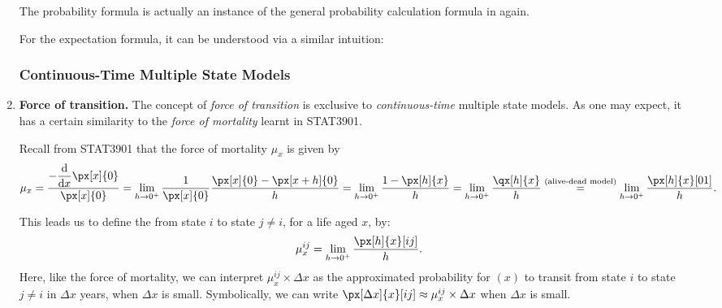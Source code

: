 \begin{enumerate}
The probability formula is actually an instance of the general
probability calculation formula in  again.
\begin{center}
\end{center}
For the expectation formula, it can be understood via a similar intuition:
\begin{center}
\end{center}
\subsubsection*{Continuous-Time Multiple State Models}
\item \textbf{Force of transition.} The concept of \emph{force of transition}
is exclusive to \emph{continuous-time} multiple state models. As one may
expect, it has a certain similarity to the \emph{force of mortality} learnt in
STAT3901.

Recall from STAT3901 that the force of mortality \(\mu_{x}\) is given by
\[
\mu_{x}=\frac{\displaystyle -\dv{}{x}\px[x]{0}}{\px[x]{0}}
=\lim_{h\to 0^{+}}\frac{1}{\px[x]{0}}\frac{\px[x]{0}-\px[x+h]{0}}{h}
=\lim_{h\to 0^{+}}\frac{1-\px[h]{x}}{h}
=\lim_{h\to 0^{+}}\frac{\qx[h]{x}}{h}
\overset{\text{(alive-dead model)}}{=}
\lim_{h\to 0^{+}}\frac{\px[h]{x}[01]}{h}.
\]

This leads us to define the  from state \(i\) to state
\(j\ne i\), for a life aged \(x\), by:
\[
\mu_{x}^{ij}=\lim_{h\to 0^{+}}\frac{\px[h]{x}[ij]}{h}.
\]
Here, like the force of mortality, we can interpret \(\mu_{x}^{ij}\times \Delta
x\) as the approximated probability for \((x)\) to transit from state \(i\) to
state \(j\ne i\) in \(\Delta x\) years, when \(\Delta x\) is small.
Symbolically, we can write \(\px[\Delta x]{x}[ij]\approx \mu_{x}^{ij}\times
\Delta x\) when \(\Delta x\) is small.


\end{enumerate}
